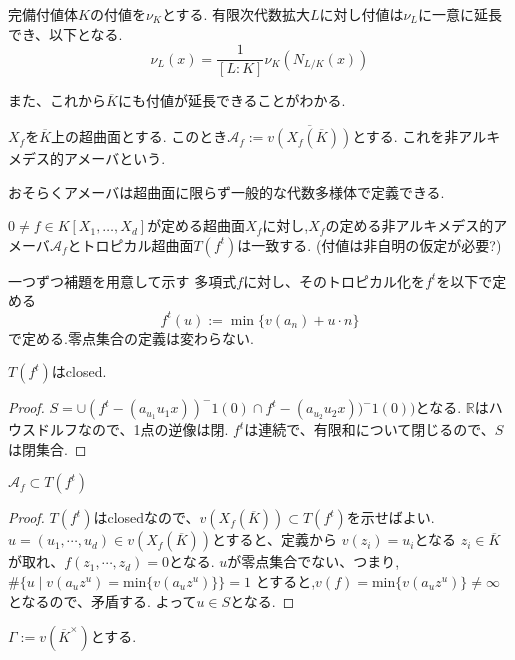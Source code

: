 \documentclass{ujarticle}
\begin{document}
\begin{thm}
完備付値体$K$の付値を$\nu_K$とする.
有限次代数拡大$L$に対し付値は$\nu_L$に一意に延長でき、以下となる.
\begin{equation*}
  \nu_L(x)= \frac{1}{[L:K]} \nu_K(N_{L/K}(x))
\end{equation*}
\end{thm}
また、これから$\overline{K}$にも付値が延長できることがわかる.

\begin{dfn}
 $X_f$を$\overline{K}$上の超曲面とする.
 このとき$\mathcal{A}_f:= \overline{v(X_f(\overline{K}))}$とする.
 これを非アルキメデス的アメーバという.
\end{dfn}
\begin{rem}
  おそらくアメーバは超曲面に限らず一般的な代数多様体で定義できる.
\end{rem}


\begin{thm}
$0 \neq f \in K[X_1,\dots,X_d]$が定める超曲面$X_f$に対し,$X_f$の定める非アルキメデス的アメーバ$\mathcal{A}_f$とトロピカル超曲面$T(f^t)$は一致する.
(付値は非自明の仮定が必要?)
\end{thm}
一つずつ補題を用意して示す
多項式$f$に対し、そのトロピカル化を$f^t$を以下で定める
\begin{equation*}
  f^t(u) := \min\{v(a_n) + u \cdot n\}
\end{equation*}
で定める.零点集合の定義は変わらない.
\begin{lem}
$T(f^t)$はclosed.
\end{lem}
\begin{proof}
  $S = \cup (f^t -(a_{u_1}u_1x))^-1(0) \cap f^t -(a_{u_2}u_2x))^-1(0))$となる.
  $\mathbb{R}$はハウスドルフなので、1点の逆像は閉.
  $f^t$は連続で、有限和について閉じるので、$S$は閉集合.
\end{proof}
\begin{lem}
 $\mathcal{A}_f \subset T(f^t)$
\end{lem}
\begin{proof}
$T(f^t)$はclosedなので、$v(X_f(\overline{K})) \subset T(f^t)$を示せばよい.
$u = (u_1,\cdots,u_d )\in v(X_f(\overline{K})) $とすると、定義から
$v(z_i) = u_i$となる $ z_i \in \overline{K}$が取れ、$f(z_1,\cdots,z_d)=0$となる.
$u$が零点集合でない、つまり,$ \# \{ u \mid v(a_uz^u) =\mathrm{min}\{v(a_uz^u)\} \} =1$
とすると,$v(f) = \mathrm{min} \{v(a_uz^u) \} \neq \infty$となるので、矛盾する.
よって$u \in S$となる.
\end{proof}
$\Gamma := v(\overline{K}^{\times})$とする.
\end{document}
